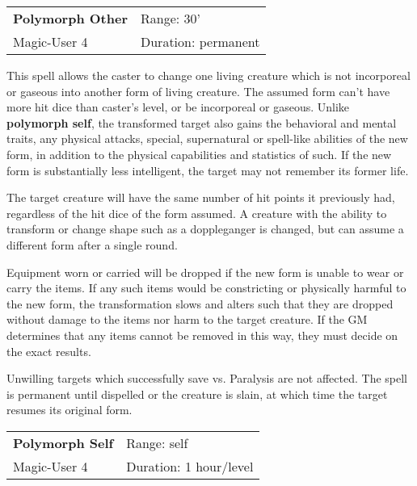 \documentclass[a4paper,twoside,openany,10pt]{book}
\begin{document}
\begin{multicols}{2}
\smallskip\begin{flushleft} 
	\begin{tabularx}{0.45\textwidth}{@{}m{3.5cm}m{5.5cm}@{}} 
		\textbf{Polymorph Other} & Range: 30'\\
		Magic-User 4 &Duration: permanent\\
	\end{tabularx}\end{flushleft}

This spell allows the caster to change one living creature which is not incorporeal or gaseous into another form of living creature. The assumed form can't have more hit dice than caster's level, or be incorporeal or gaseous. Unlike \textbf{polymorph self}, the transformed target also gains the behavioral and mental traits, any physical attacks, special, supernatural or spell-like abilities of the new form, in addition to the physical capabilities and statistics of such. If the new form is substantially less intelligent, the target may not remember its former life.

The target creature will have the same number of hit points it previously had, regardless of the hit dice of the form assumed. A creature with the ability to transform or change shape such as a doppleganger is changed, but can assume a different form after a single round.

Equipment worn or carried will be dropped if the new form is unable to wear or carry the items. If any such items would be constricting or physically harmful to the new form, the transformation slows and alters such that they are dropped without damage to the items nor harm to the target creature. If the GM determines that any items cannot be removed in this way, they must decide on the exact results.

Unwilling targets which successfully save vs. Paralysis are not affected. The spell is permanent until dispelled or the creature is slain, at which time the target resumes its original form.

\smallskip\begin{flushleft} 
	\begin{tabularx}{0.45\textwidth}{@{}m{3.5cm}m{5.5cm}@{}} 
		\textbf{Polymorph Self} & Range: self\\
Magic-User 4 & Duration: 1 hour/level\\
	\end{tabularx}\end{flushleft}


\end{multicols}
\end{document}
